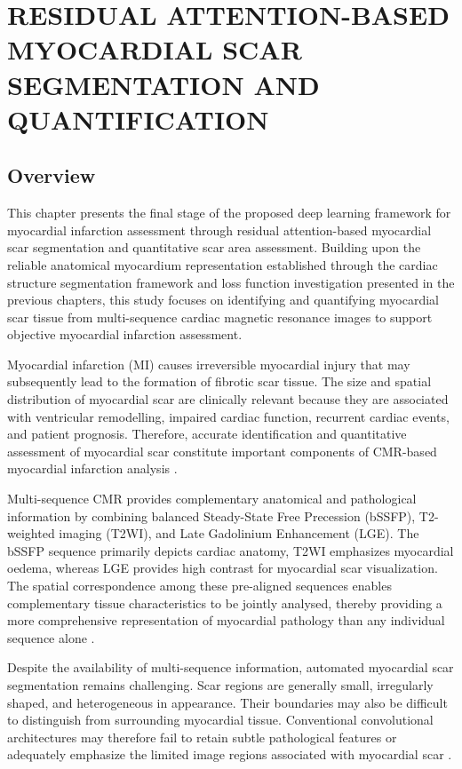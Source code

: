 \chapter{RESIDUAL ATTENTION-BASED MYOCARDIAL SCAR SEGMENTATION AND QUANTIFICATION}

\label{chap:6}

\section{Overview}
\label{sec:ch6-intro-overview}

This chapter presents the final stage of the proposed deep learning framework for myocardial infarction assessment through residual attention-based myocardial scar segmentation and quantitative scar area assessment. Building upon the reliable anatomical myocardium representation established through the cardiac structure segmentation framework and loss function investigation presented in the previous chapters, this study focuses on identifying and quantifying myocardial scar tissue from multi-sequence cardiac magnetic resonance images to support objective myocardial infarction assessment.

Myocardial infarction (MI) causes irreversible myocardial injury that may subsequently lead to the formation of fibrotic scar tissue. The size and spatial distribution of myocardial scar are clinically relevant because they are associated with ventricular remodelling, impaired cardiac function, recurrent cardiac events, and patient prognosis. Therefore, accurate identification and quantitative assessment of myocardial scar constitute important components of CMR-based myocardial infarction analysis \citep{Richardson2015,Wu2021}.

Multi-sequence CMR provides complementary anatomical and pathological information by combining balanced Steady-State Free Precession (bSSFP), T2-weighted imaging (T2WI), and Late Gadolinium Enhancement (LGE). The bSSFP sequence primarily depicts cardiac anatomy, T2WI emphasizes myocardial oedema, whereas LGE provides high contrast for myocardial scar visualization. The spatial correspondence among these pre-aligned sequences enables complementary tissue characteristics to be jointly analysed, thereby providing a more comprehensive representation of myocardial pathology than any individual sequence alone \citep{Li2023MyoPS,Ding2023}.

Despite the availability of multi-sequence information, automated myocardial scar segmentation remains challenging. Scar regions are generally small, irregularly shaped, and heterogeneous in appearance. Their boundaries may also be difficult to distinguish from surrounding myocardial tissue. Conventional convolutional architectures may therefore fail to retain subtle pathological features or adequately emphasize the limited image regions associated with myocardial scar \citep{Wu2021}.


